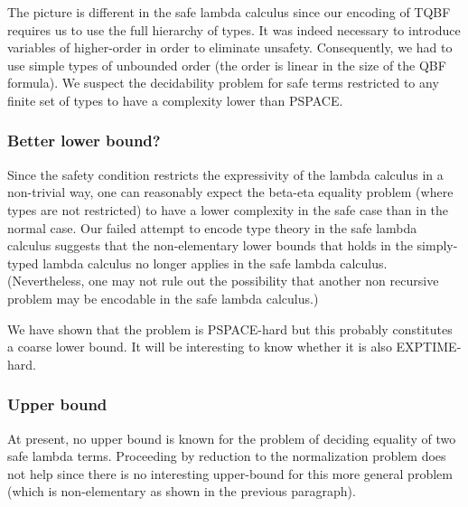 The picture is different in the safe lambda calculus since our
encoding of TQBF requires us to use the full hierarchy of types. It
was indeed necessary to introduce variables of higher-order in order
to eliminate unsafety. Consequently, we had to use simple types of
unbounded order (the order is linear in the size of the QBF
formula). We suspect the decidability problem for safe terms
restricted to any finite set of types to have a complexity lower
than PSPACE.




\subsubsection{Better lower bound?}
Since the safety condition restricts the expressivity of the lambda
calculus in a non-trivial way, one can reasonably expect the
beta-eta equality problem (where types are not restricted) to have a
lower complexity in the safe case than in the normal case. Our
failed attempt to encode type theory in the safe lambda calculus
suggests that the non-elementary lower bounds that holds in the
simply-typed lambda calculus no longer applies in the safe lambda
calculus. (Nevertheless, one may not rule out the possibility that
another non recursive problem may be encodable in the safe lambda
calculus.)

We have shown that the problem is PSPACE-hard but this probably
constitutes a coarse lower bound. It will be interesting to know
whether it is also EXPTIME-hard.


\subsubsection{Upper bound}
At present, no upper bound is known for the problem of deciding
equality of two safe lambda terms. Proceeding by reduction to the
normalization problem does not help since there is no interesting
upper-bound for this more general problem (which is non-elementary
as shown in the previous paragraph).
